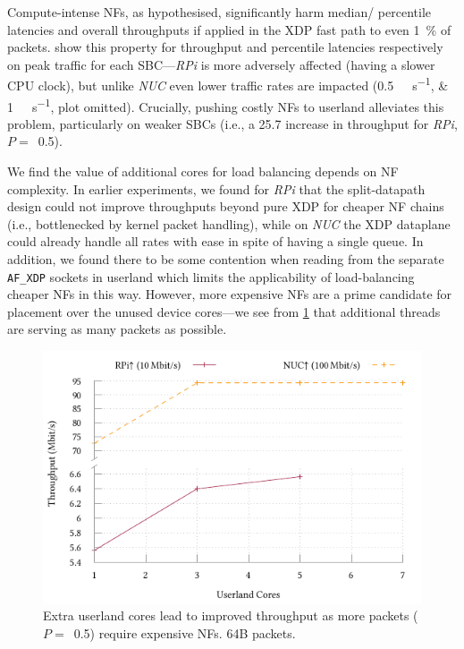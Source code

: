 \documentclass[comsoc, conference, times]{IEEEtran}
\newcommand{\afxdp}{\texttt{AF\_XDP}}
\begin{document}
Compute-intense NFs, as hypothesised, significantly harm median/ percentile latencies and overall throughputs if applied in the XDP fast path to even \qty{1}{\percent} of packets.
 show this property for throughput and  percentile latencies respectively on peak traffic for each SBC---\emph{RPi} is more adversely affected (having a slower CPU clock), but unlike \emph{NUC} even lower traffic rates are impacted (\qtylist[list-units=single]{0.5;1}{\mega\bit\per\second}, plot omitted).
Crucially, pushing costly NFs to userland alleviates this problem, particularly on weaker SBCs (i.e., a \qty{25.7}{\times} increase in throughput for \emph{RPi}, $P=$~\num{0.5}).


We find the value of additional cores for load balancing depends on NF complexity.
In earlier experiments, we found for \emph{RPi} that the split-datapath design could not improve throughputs beyond pure XDP for cheaper NF chains (i.e., bottlenecked by kernel packet handling), while on \emph{NUC} the XDP dataplane could already handle all rates with ease in spite of having a single queue.
In addition, we found there to be some contention when reading from the separate \afxdp{} sockets in userland which limits the applicability of load-balancing cheaper NFs in this way.
However, more expensive NFs are a prime candidate for placement over the unused device cores---we see from \cref{fig:tput-cores} that additional threads are serving as many packets as possible.

\begin{figure}
	\includegraphics[keepaspectratio,width=\resultplotwidth]{../plots/build/core-allev-block/tput-split}
	\caption{Extra userland cores lead to improved throughput as more packets ($P=$~\num{0.5}) require expensive NFs. 64B packets.\label{fig:tput-cores}}
\end{figure}
\end{document}
